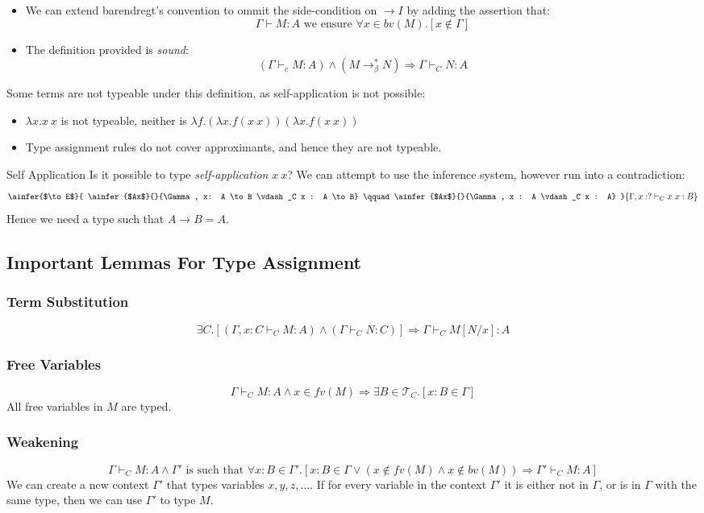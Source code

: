 \begin{itemize}
	\item {We can extend barendregt's convention to ommit the side-condition on $\to I$ by adding the assertion that:
	      \[\Gamma \vdash M : A \text{ we ensure } \forall x \in bv(M) . [x \not\in \Gamma]\]
	      }
	\item {The definition provided is \textit{sound}:
	      \[(\Gamma \vdash_c M : A) \land (M \to^*_\beta N) \Rightarrow \Gamma \vdash_C N : A \]
	      }
\end{itemize}

Some terms are not typeable under this definition, as self-application is not possible:
\begin{itemize}
	\item $\lambda x . x \ x$ is not typeable, neither is $\lambda f. (\lambda x. f(x \ x)) (\lambda x. f(x \ x))$
	\item Type assignment rules do not cover approximants, and hence they are not typeable.
\end{itemize}

\begin{examplebox}{Self Application}
	Is it possible to type \textit{self-application} $x \ x$?
	\tcblower
	We can attempt to use the inference system, however run into a contradiction:
	\[\ainfer{$\to E$}{
			\ainfer{$Ax$}{}{\Gamma, x: A \to B \vdash_C x : A \to B} \qquad \ainfer{$Ax$}{}{\Gamma, x : A \vdash_C x : A}
		}{\Gamma, x: ? \vdash_C x \ x : B}\]
	Hence we need a type such that $A \to B = A$.
\end{examplebox}

\subsection{Important Lemmas For Type Assignment}
\subsubsection{Term Substitution}
\[\exists C . [(\Gamma, x:C \vdash_C M:A) \land (\Gamma \vdash_C N : C)] \Rightarrow \Gamma \vdash_C M[N/x] : A\]

\subsubsection{Free Variables}
\[\Gamma \vdash_C M : A \land x \in fv(M) \Rightarrow \exists B \in \mathcal{T}_C . [x : B \in \Gamma]\]
All free variables in $M$ are typed.
\subsubsection{Weakening}
\[\Gamma \vdash_C M : A \land \Gamma' \text{ is such that } \forall x: B \in \Gamma' . [x:B \in \Gamma \lor (x \not\in fv(M) \land x \not\in bv(M)) \Rightarrow \Gamma' \vdash_C M : A]\]
We can create a new context $\Gamma'$ that types variables $x,y,z, \dots$. If for every variable in the context $\Gamma'$ it is either not in $\Gamma$, or is in $\Gamma$  with the same type, then we can use $\Gamma'$ to type $M$.

